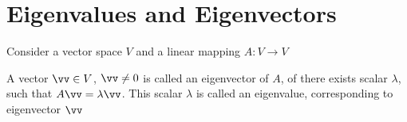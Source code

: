 \chapter{Eigenvalues and Eigenvectors}
Consider a vector space $V$ and a linear mapping $A:V\to V$
\begin{definition}
A vector $\vv\in V$, $\vv\not=0$ is called an eigenvector of $A$, of there exists scalar $\lambda$, such that $A\vv = \lambda\vv$. This scalar $\lambda$ is called an eigenvalue, corresponding to eigenvector $\vv$
\end{definition}
